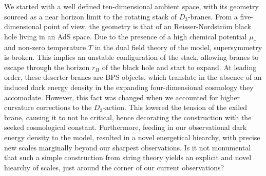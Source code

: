 We started with a well defined ten-dimensional ambient space, with its geometry sourced as a near horizon limit to the rotating stack of $D_{3}$-branes. From a five-dimensional point of view, the geometry is that of an Reisser-Nordström black hole living in an AdS space. Due to the presence of a high chemical potential $\mu_{c}$ and non-zero temperature $T$ in the dual field theory of the model, supersymmetry is broken. This implies an unstable configuration of the stack, allowing branes to escape through the horizon $r_{H}$ of the black hole and start to expand. At leading order, these deserter branes are BPS objects, which translate in the absence of an induced dark energy density in the expanding four-dimensional cosmology they accomodate. However, this fact was changed when we accounted for higher curvature corrections to the $D_{3}$-action. This lowered the tension of the exiled brane, causing it to not be critical, hence decorating the construction with the seeked cosmological constant. Furthermore, feeding in our observational dark energy density to the model, resulted in a novel energetical hiearchy, with precise new scales marginally beyond our sharpest observations. Is it not monumental that such a simple construction from string theory yields an explicit and novel hiearchy of scales, just around the corner of our current observations? 




